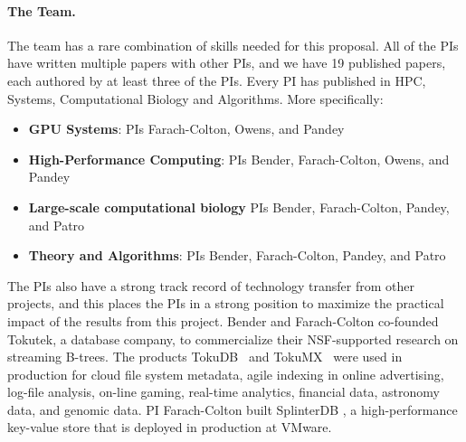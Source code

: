 
\paragraph{The Team.}
The team has a rare combination of skills needed for this proposal.    All of the PIs have written multiple papers with other PIs, and we have 19 published papers, each authored by at least three  of the PIs.
 Every PI has published in HPC, Systems, Computational Biology and Algorithms.  More specifically:


\begin{itemize}%
    \item \textbf{GPU Systems}: PIs Farach-Colton, Owens, and Pandey

    \item \textbf{High-Performance Computing}: PIs Bender, Farach-Colton, Owens, and Pandey

    \item \textbf{Large-scale computational biology} PIs Bender, Farach-Colton, Pandey, and Patro

        \item \textbf{Theory and Algorithms}: PIs Bender, Farach-Colton, Pandey, and Patro
    

\end{itemize}

The PIs also have a strong track record of technology transfer from other projects, and this places the PIs in a strong position to maximize the practical impact of the results from this project. 
%
Bender and Farach-Colton co-founded Tokutek, a database company, to commercialize their
NSF-supported research on streaming
B-trees. The products TokuDB~\cite{TokuDB} and TokuMX~\cite{TokuMX} were used in
production for cloud file system metadata, agile indexing in online
advertising, log-file analysis, on-line gaming, real-time analytics,
financial data, astronomy data, and genomic data.
PI Farach-Colton  built SplinterDB \cite{splinterdb, splinterdb2}, a high-performance key-value store that is deployed in production at VMware.

